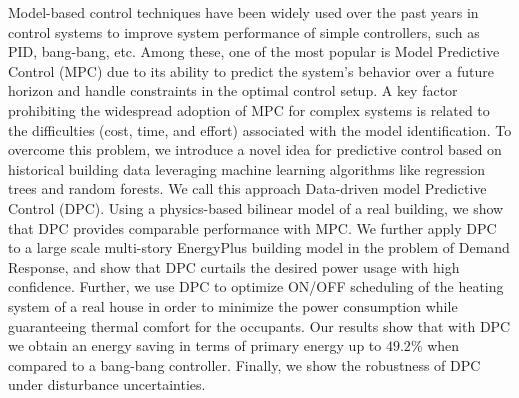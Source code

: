 Model-based control techniques have been widely used over the past years in control systems to improve system performance of simple controllers, such as PID, bang-bang, etc. 
Among these, one of the most popular is Model Predictive Control (MPC) due to its ability to predict the system's behavior over a future horizon and handle constraints in the optimal control setup.
A key factor prohibiting the widespread adoption of MPC for complex systems is related to the difficulties (cost, time, and effort) associated with the model identification. 
\textcolor[rgb]{0,0,1}{To overcome this problem, we introduce a novel idea for predictive control based on historical building data leveraging machine learning algorithms like regression trees and random forests. We call this approach Data-driven model Predictive Control (DPC).
Using a physics-based bilinear model of a real building, we show that DPC provides comparable performance with MPC.
We further apply DPC to a large scale multi-story EnergyPlus building model in the problem of Demand Response, and show that DPC curtails the desired power usage with high confidence.}
Further, we use DPC to optimize ON/OFF scheduling of the heating system of a real house in order to minimize the power consumption while guaranteeing thermal comfort for the occupants.
Our results show that with DPC we obtain an energy saving in terms of primary energy up to $49.2\%$ when compared to a bang-bang controller.
\textcolor[rgb]{0,0,1}{Finally, we show the robustness of DPC under disturbance uncertainties.}